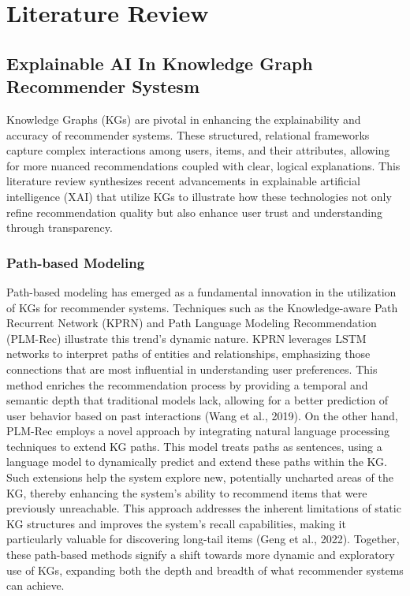 \chapter{Literature Review}\label{chap:literature_review}



\section{Explainable AI In Knowledge Graph Recommender Systesm}

Knowledge Graphs (KGs) are pivotal in enhancing the explainability and accuracy of recommender systems. These structured, relational frameworks capture complex interactions among users, items, and their attributes, allowing for more nuanced recommendations coupled with clear, logical explanations. This literature review synthesizes recent advancements in explainable artificial intelligence (XAI) that utilize KGs to illustrate how these technologies not only refine recommendation quality but also enhance user trust and understanding through transparency.

\subsection{Path-based Modeling}

Path-based modeling has emerged as a fundamental innovation in the utilization of KGs for recommender systems. Techniques such as the Knowledge-aware Path Recurrent Network (KPRN) and Path Language Modeling Recommendation (PLM-Rec) illustrate this trend's dynamic nature. KPRN leverages LSTM networks to interpret paths of entities and relationships, emphasizing those connections that are most influential in understanding user preferences. This method enriches the recommendation process by providing a temporal and semantic depth that traditional models lack, allowing for a better prediction of user behavior based on past interactions (Wang et al., 2019).
On the other hand, PLM-Rec employs a novel approach by integrating natural language processing techniques to extend KG paths. This model treats paths as sentences, using a language model to dynamically predict and extend these paths within the KG. Such extensions help the system explore new, potentially uncharted areas of the KG, thereby enhancing the system’s ability to recommend items that were previously unreachable. This approach addresses the inherent limitations of static KG structures and improves the system's recall capabilities, making it particularly valuable for discovering long-tail items (Geng et al., 2022). Together, these path-based methods signify a shift towards more dynamic and exploratory use of KGs, expanding both the depth and breadth of what recommender systems can achieve.


